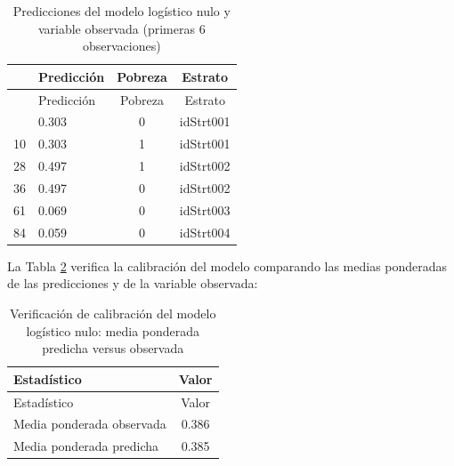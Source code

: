 \documentclass[
  spanish,
  12pt,
]{book}
\newenvironment{Shaded}{\begin{snugshade}}{\end{snugshade}}
\newcommand{\AttributeTok}[1]{\textcolor[rgb]{0.13,0.29,0.53}{#1}}
\newcommand{\DecValTok}[1]{\textcolor[rgb]{0.00,0.00,0.81}{#1}}
\newcommand{\FunctionTok}[1]{\textcolor[rgb]{0.13,0.29,0.53}{\textbf{#1}}}
\newcommand{\NormalTok}[1]{#1}
\newcommand{\OtherTok}[1]{\textcolor[rgb]{0.56,0.35,0.01}{#1}}
\newcommand{\SpecialCharTok}[1]{\textcolor[rgb]{0.81,0.36,0.00}{\textbf{#1}}}
\newcommand{\StringTok}[1]{\textcolor[rgb]{0.31,0.60,0.02}{#1}}
\begin{document}
\begin{longtable}[]{@{}llcc@{}}
\caption{\label{tab:tab-icc-pred-logit-nulo}Predicciones del modelo logístico nulo y variable observada (primeras 6 observaciones)}\tabularnewline
\toprule\noalign{}
& Predicción & Pobreza & Estrato \\
\midrule\noalign{}
\endfirsthead
\toprule\noalign{}
& Predicción & Pobreza & Estrato \\
\midrule\noalign{}
\endhead
\bottomrule\noalign{}
\endlastfoot
1 & 0.303 & 0 & idStrt001 \\
10 & 0.303 & 1 & idStrt001 \\
28 & 0.497 & 1 & idStrt002 \\
36 & 0.497 & 0 & idStrt002 \\
61 & 0.069 & 0 & idStrt003 \\
84 & 0.059 & 0 & idStrt004 \\
\end{longtable}

La Tabla \ref{tab:tab-calibracion-logit-nulo} verifica la calibración del modelo comparando las medias ponderadas de las predicciones y de la variable observada:

\begin{Shaded}
\end{Shaded}

\begin{longtable}[]{@{}lc@{}}
\caption{\label{tab:tab-calibracion-logit-nulo}Verificación de calibración del modelo logístico nulo: media ponderada predicha versus observada}\tabularnewline
\toprule\noalign{}
Estadístico & Valor \\
\midrule\noalign{}
\endfirsthead
\toprule\noalign{}
Estadístico & Valor \\
\midrule\noalign{}
\endhead
\bottomrule\noalign{}
\endlastfoot
Media ponderada observada & 0.386 \\
Media ponderada predicha & 0.385 \\
\end{longtable}
\end{document}
